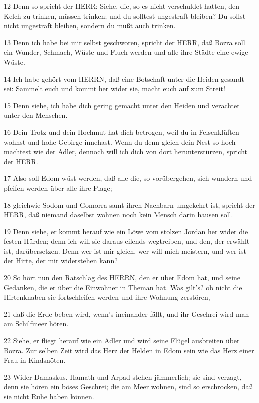\par 12 Denn so spricht der HERR: Siehe, die, so es nicht verschuldet hatten, den Kelch zu trinken, müssen trinken; und du solltest ungestraft bleiben? Du sollst nicht ungestraft bleiben, sondern du mußt auch trinken.
\par 13 Denn ich habe bei mir selbst geschworen, spricht der HERR, daß Bozra soll ein Wunder, Schmach, Wüste und Fluch werden und alle ihre Städte eine ewige Wüste.
\par 14 Ich habe gehört vom HERRN, daß eine Botschaft unter die Heiden gesandt sei: Sammelt euch und kommt her wider sie, macht euch auf zum Streit!
\par 15 Denn siehe, ich habe dich gering gemacht unter den Heiden und verachtet unter den Menschen.
\par 16 Dein Trotz und dein Hochmut hat dich betrogen, weil du in Felsenklüften wohnst und hohe Gebirge innehast. Wenn du denn gleich dein Nest so hoch machtest wie der Adler, dennoch will ich dich von dort herunterstürzen, spricht der HERR.
\par 17 Also soll Edom wüst werden, daß alle die, so vorübergehen, sich wundern und pfeifen werden über alle ihre Plage;
\par 18 gleichwie Sodom und Gomorra samt ihren Nachbarn umgekehrt ist, spricht der HERR, daß niemand daselbst wohnen noch kein Mensch darin hausen soll.
\par 19 Denn siehe, er kommt herauf wie ein Löwe vom stolzen Jordan her wider die festen Hürden; denn ich will sie daraus eilends wegtreiben, und den, der erwählt ist, darübersetzen. Denn wer ist mir gleich, wer will mich meistern, und wer ist der Hirte, der mir widerstehen kann?
\par 20 So hört nun den Ratschlag des HERRN, den er über Edom hat, und seine Gedanken, die er über die Einwohner in Theman hat. Was gilt's? ob nicht die Hirtenknaben sie fortschleifen werden und ihre Wohnung zerstören,
\par 21 daß die Erde beben wird, wenn's ineinander fällt, und ihr Geschrei wird man am Schilfmeer hören.
\par 22 Siehe, er fliegt herauf wie ein Adler und wird seine Flügel ausbreiten über Bozra. Zur selben Zeit wird das Herz der Helden in Edom sein wie das Herz einer Frau in Kindsnöten.
\par 23 Wider Damaskus. Hamath und Arpad stehen jämmerlich; sie sind verzagt, denn sie hören ein böses Geschrei; die am Meer wohnen, sind so erschrocken, daß sie nicht Ruhe haben können.
